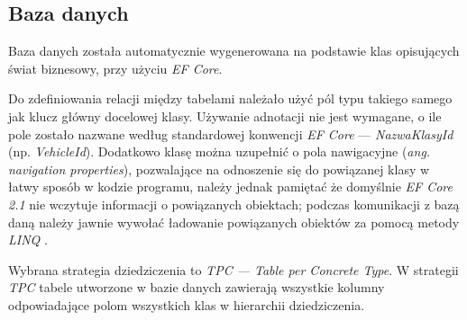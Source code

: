 \documentclass[eng,printmode,openany]{mgr}
\begin{document}
	\subsection{Baza danych}
	Baza danych została automatycznie wygenerowana na podstawie klas opisujących świat biznesowy, przy użyciu \textit{EF Core}. 
	
	Do zdefiniowania relacji między tabelami należało użyć pól typu takiego samego jak klucz główny docelowej klasy\cite{msdn-efcore-relationships}. Używanie adnotacji nie jest wymagane, o ile pole zostało nazwane według standardowej konwencji \textit{EF Core} — \textit{NazwaKlasyId} (np. \textit{VehicleId}). Dodatkowo klasę można uzupełnić o pola nawigacyjne (\textit{ang. navigation properties}), pozwalające na odnoszenie się do powiązanej klasy w łatwy sposób w kodzie programu, należy jednak pamiętać że domyślnie \textit{EF Core 2.1} nie wczytuje informacji o powiązanych obiektach; podczas komunikacji z bazą daną należy jawnie wywołać ładowanie powiązanych obiektów za pomocą metody \textit{LINQ} .
	
	
	
	
	
	
	Wybrana strategia dziedziczenia to \textit{TPC — Table per Concrete Type}. W strategii \textit{TPC} tabele utworzone w bazie danych zawierają wszystkie kolumny odpowiadające polom wszystkich klas w hierarchii dziedziczenia.
	
	\newpage
\end{document}
